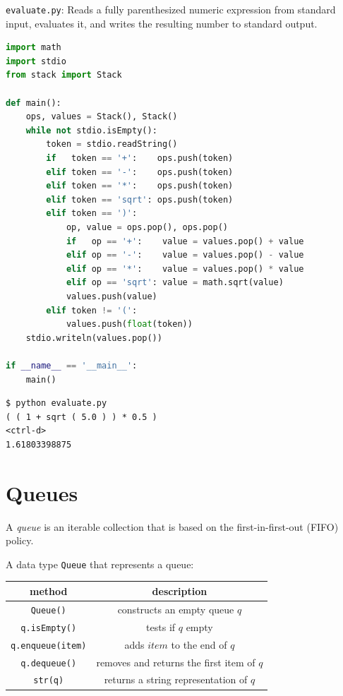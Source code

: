 \documentclass[8pt,a4paper,compress,handout]{beamer}
\begin{document}
\begin{frame}[fragile]
\begin{framed}
\tiny \lstinline{evaluate.py}: Reads a fully parenthesized numeric expression from standard input, evaluates it, and writes the resulting number to standard output.
\end{framed}

\begin{lstlisting}[language=Python]
import math
import stdio
from stack import Stack

def main():
    ops, values = Stack(), Stack()
    while not stdio.isEmpty():
        token = stdio.readString()
        if   token == '+':    ops.push(token)
        elif token == '-':    ops.push(token)
        elif token == '*':    ops.push(token)
        elif token == 'sqrt': ops.push(token)
        elif token == ')':
            op, value = ops.pop(), ops.pop()
            if   op == '+':    value = values.pop() + value
            elif op == '-':    value = values.pop() - value
            elif op == '*':    value = values.pop() * value
            elif op == 'sqrt': value = math.sqrt(value)
            values.push(value)
        elif token != '(':
            values.push(float(token))
    stdio.writeln(values.pop())

if __name__ == '__main__':
    main()
\end{lstlisting}

\begin{lstlisting}[language={}]
$ python evaluate.py
( ( 1 + sqrt ( 5.0 ) ) * 0.5 )
<ctrl-d>
1.61803398875
\end{lstlisting}
\end{frame}

\section{Queues}
\begin{frame}[fragile]
A \emph{queue} is an iterable collection that is based on the first-in-first-out (FIFO) policy.

\bigskip

A data type \lstinline{Queue} that represents a queue:
\begin{center}
\begin{tabular}{cc}
method & description \\ \hline
\lstinline$Queue()$ & constructs an empty queue $q$ \\
\lstinline$q.isEmpty()$ & tests if $q$ empty \\
\lstinline$q.enqueue(item)$ & adds $item$ to the end of $q$ \\
\lstinline$q.dequeue()$ &  removes and returns the first item of $q$ \\
\lstinline$str(q)$ & returns a string representation of $q$
\end{tabular} 
\end{center}
\end{frame}
\end{document}
